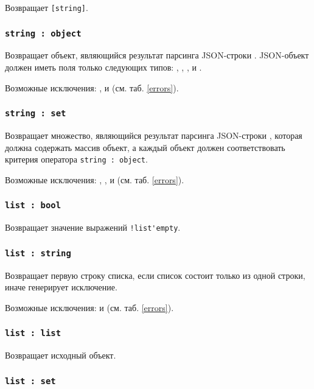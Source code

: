 Возвращает \lstinline|[string]|.

\subsubsection{\lstinline|string : object|}

Возвращает объект, являющийся результат парсинга JSON-строки \str. JSON-объект должен иметь поля только следующих типов: \bool, \integer, \double, \str{} и \listtype.

Возможные исключения: ,  и  (см. таб. \ref{errors}).

\subsubsection{\lstinline|string : set|}

Возвращает множество, являющийся результат парсинга JSON-строки \str, которая должна содержать массив объект, а каждый объект должен соответствовать критерия оператора \lstinline|string : object|.

Возможные исключения: , ,  и  (см. таб. \ref{errors}).

\subsubsection{\lstinline|list : bool|}

Возвращает значение выражений \lstinline|!list'empty|.

\subsubsection{\lstinline|list : string|}

Возвращает первую строку списка, если список состоит только из одной строки, иначе генерирует исключение.

Возможные исключения:  и  (см. таб. \ref{errors}).

\subsubsection{\lstinline|list : list|}

Возвращает исходный объект.

\subsubsection{\lstinline|list : set|}

